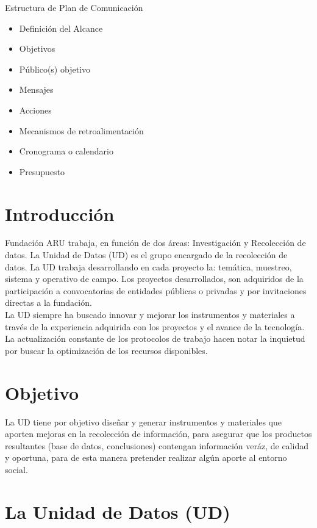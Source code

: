 \documentclass{article}
\begin{document}
Estructura de Plan de Comunicación
\begin{itemize}
\item Definición del Alcance
\item Objetivos
\item Público(s) objetivo
\item Mensajes
\item Acciones
\item Mecanismos de retroalimentación
\item Cronograma o calendario
\item Presupuesto
\end{itemize}

\section{Introducción}

Fundación ARU trabaja, en función de dos áreas: Investigación y Recolección de datos. La Unidad de Datos (UD) es el grupo encargado de la recolección de datos. La UD trabaja desarrollando en cada proyecto la: temática, muestreo, sistema y operativo de campo. Los proyectos desarrollados, son adquiridos de la participación a convocatorias de entidades públicas o privadas y por invitaciones directas a la fundación.\\

La UD siempre ha buscado innovar y mejorar los instrumentos y materiales a través de la experiencia adquirida con los proyectos y el avance de la tecnología. La actualización constante de los protocolos de trabajo hacen notar la inquietud por buscar la optimización de los recursos disponibles. 




\section{Objetivo}

La UD tiene por objetivo diseñar y generar instrumentos y materiales que aporten mejoras en la recolección de información, para asegurar que los productos resultantes (base de datos, conclusiones) contengan información veráz, de calidad y oportuna, para de esta manera pretender realizar algún aporte al entorno social.
\section{La Unidad de Datos (UD)}
\end{document}
